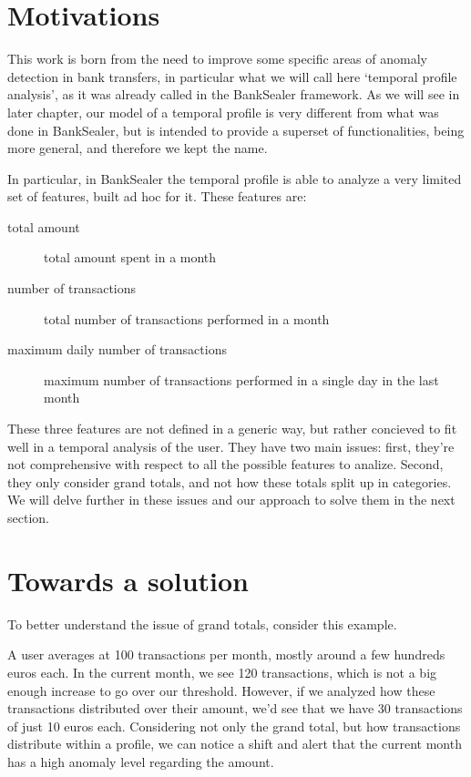 
\section{Motivations}

This work is born from the need to improve some specific areas of anomaly detection in bank transfers, in particular what we will call here `temporal profile analysis', as it was already called in the BankSealer framework. As we will see in later chapter, our model of a temporal profile is very different from what was done in BankSealer, but is intended to provide a superset of functionalities, being more general, and therefore we kept the name.

In particular, in BankSealer the temporal profile is able to analyze a very limited set of features, built ad hoc for it. These features are:
\begin{description}
  \item[total amount] total amount spent in a month
  \item[number of transactions] total number of transactions performed in a month
  \item[maximum daily number of transactions] maximum number of transactions performed in a single day in the last month
\end{description}

These three features are not defined in a generic way, but rather concieved to fit well in a temporal analysis of the user. They have two main issues: first, they're not comprehensive with respect to all the possible features to analize. Second, they only consider grand totals, and not how these totals split up in categories. We will delve further in these issues and our approach to solve them in the next section.

\section{Towards a solution}

To better understand the issue of grand totals, consider this example.

A user averages at 100 transactions per month, mostly around a few hundreds euros each. In the current month, we see 120 transactions, which is not a big enough increase to go over our threshold. However, if we analyzed how these transactions distributed over their amount, we'd see that we have 30 transactions of just 10 euros each. Considering not only the grand total, but how transactions distribute within a profile, we can notice a shift and alert that the current month has a high anomaly level regarding the amount.

